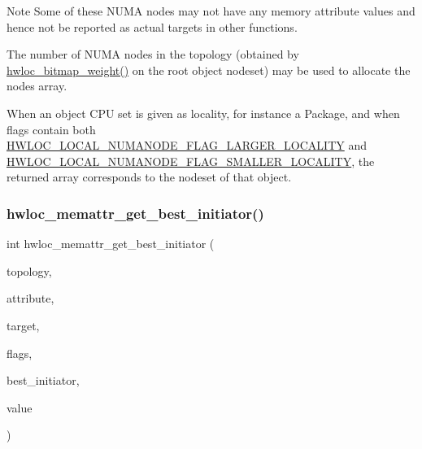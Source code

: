 \begin{DoxyNote}{Note}
Some of these N\+U\+MA nodes may not have any memory attribute values and hence not be reported as actual targets in other functions.

The number of N\+U\+MA nodes in the topology (obtained by \hyperlink{a00205_ga0200466842c0e1f5da75e84dde460b10}{hwloc\+\_\+bitmap\+\_\+weight()} on the root object nodeset) may be used to allocate the {\ttfamily nodes} array.

When an object C\+PU set is given as locality, for instance a Package, and when flags contain both \hyperlink{a00211_ggab9c963ca37255da71b00d94e1b106f9da200c6c133bb2125ba36d77ce9ca268cc}{H\+W\+L\+O\+C\+\_\+\+L\+O\+C\+A\+L\+\_\+\+N\+U\+M\+A\+N\+O\+D\+E\+\_\+\+F\+L\+A\+G\+\_\+\+L\+A\+R\+G\+E\+R\+\_\+\+L\+O\+C\+A\+L\+I\+TY} and \hyperlink{a00211_ggab9c963ca37255da71b00d94e1b106f9daac9c5e3a2cfb1b193e4acfceaf3bad57}{H\+W\+L\+O\+C\+\_\+\+L\+O\+C\+A\+L\+\_\+\+N\+U\+M\+A\+N\+O\+D\+E\+\_\+\+F\+L\+A\+G\+\_\+\+S\+M\+A\+L\+L\+E\+R\+\_\+\+L\+O\+C\+A\+L\+I\+TY}, the returned array corresponds to the nodeset of that object. 
\end{DoxyNote}
\mbox{\label{a00211_ga9a453879892893cf8a3fcd431ade84cd}} 
\subsubsection{\texorpdfstring{hwloc\+\_\+memattr\+\_\+get\+\_\+best\+\_\+initiator()}{hwloc\_memattr\_get\_best\_initiator()}}
{\footnotesize\ttfamily int hwloc\+\_\+memattr\+\_\+get\+\_\+best\+\_\+initiator (\begin{DoxyParamCaption}\item[{\hyperlink{a00186_ga9d1e76ee15a7dee158b786c30b6a6e38}{hwloc\+\_\+topology\+\_\+t}}]{topology,  }\item[{\hyperlink{a00211_gacc82003a8610be554615995f0996c888}{hwloc\+\_\+memattr\+\_\+id\+\_\+t}}]{attribute,  }\item[{\hyperlink{a00185_ga79b8ab56877ef99ac59b833203391c7d}{hwloc\+\_\+obj\+\_\+t}}]{target,  }\item[{unsigned long}]{flags,  }\item[{struct \hyperlink{a00314}{hwloc\+\_\+location} $\ast$}]{best\+\_\+initiator,  }\item[{hwloc\+\_\+uint64\+\_\+t $\ast$}]{value }\end{DoxyParamCaption})}



